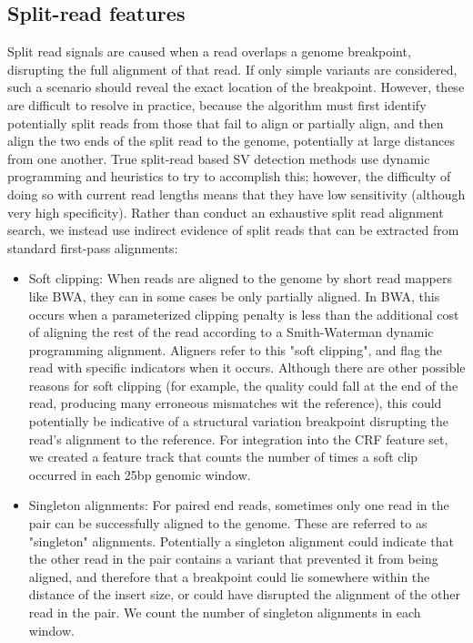\subsection{Split-read features}

Split read signals are caused when a read overlaps a genome breakpoint, disrupting the full alignment of that read. If only simple variants are considered, such a scenario should reveal the exact location of the breakpoint. However, these are difficult to resolve in practice, because the algorithm must first identify potentially split reads from those that fail to align or partially align, and then align the two ends of the split read to the genome, potentially at large distances from one another. True split-read based SV detection methods use dynamic programming and heuristics to try to accomplish this; however, the difficulty of doing so with current read lengths means that they have low sensitivity (although very high specificity). Rather than conduct an exhaustive split read alignment search, we instead use indirect evidence of split reads that can be extracted from standard first-pass alignments:

\begin{itemize}
\item Soft clipping: When reads are aligned to the genome by short read mappers like BWA, they can in some cases be only partially aligned. In BWA, this occurs when a parameterized clipping penalty is less than the additional cost of aligning the rest of the read according to a Smith-Waterman dynamic programming alignment. Aligners refer to this "soft clipping", and flag the read with specific indicators when it occurs. Although there are other possible reasons for soft clipping (for example, the quality could fall at the end of the read, producing many erroneous mismatches wit the reference), this could potentially be indicative of a structural variation breakpoint disrupting the read's alignment to the reference. For integration into the CRF feature set, we created a feature track that counts the number of times a soft clip occurred in each 25bp genomic window.

\item Singleton alignments: For paired end reads, sometimes only one read in the pair can be successfully aligned to the genome. These are referred to as "singleton" alignments. Potentially a singleton alignment could indicate that the other read in the pair contains a variant that prevented it from being aligned, and therefore that a breakpoint could lie somewhere within the distance of the insert size, or could have disrupted the alignment of the other read in the pair. We count the number of singleton alignments in each window. 
\end{itemize}

